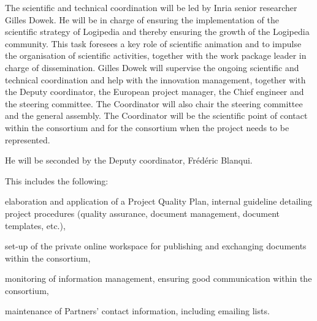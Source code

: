 \begin{workpackage}[id=management,type=MGT,wphases=1-48,
  short=Management,
  title=Management,
  lead=Inr,InrRM=34,InnRM=2,SacRM=2,TumRM=2,LieRM=2,BelRM=2,DelRM=2,FauRM=2]
\begin{tasklist}
  \begin{task}[id=coordination,title=Scientific and technical coordination,shorttitle=Sci.\&tech.,lead=Inr,InrRM=10,wphases=1-48]
    The scientific and technical coordination will be led by Inria
    senior researcher Gilles Dowek. He will be in charge of ensuring
    the implementation of the scientific strategy of Logipedia and
    thereby ensuring the growth of the Logipedia community. This task
    foresees a key role of scientific animation and to impulse the
    organisation of scientific activities, together with the work package
    leader
    in charge of dissemination. Gilles Dowek will supervise the
    ongoing scientific and technical coordination and help with the
    innovation management, together with the Deputy coordinator,
    the European project manager, 
    the
    Chief engineer and the steering committee. The
    Coordinator will also chair the steering committee and the general
    assembly. The Coordinator will be the scientific point of contact
    within the consortium and for the consortium when the project
    needs to be represented.

    He will be seconded by the Deputy coordinator, Frédéric
    Blanqui.
  \end{task}


  \begin{task}[id=quality,title=Quality manadement,shorttitle=Sci.\&tech.,lead=Inr,InrRM=10,wphases=1-48]

    This includes the following:
\begin{compactitem}
\item
  elaboration and application of a Project Quality Plan, internal
  guideline detailing project procedures (quality assurance, document
  management, document templates, etc.),
\item
  set-up of the private online workspace for publishing and exchanging
  documents within the consortium, 
\item
  monitoring of information management, ensuring good communication
  within the consortium,
\item
  maintenance of Partners’ contact information, including emailing lists.
\end{compactitem}
\end{task}


\end{tasklist}
\end{workpackage}
